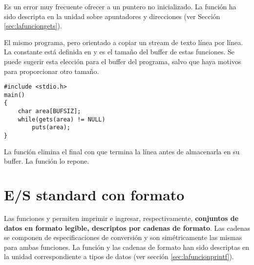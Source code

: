 Es un error muy frecuente ofrecer a  un puntero
no inicializado. La función  ha sido descripta en la unidad sobre
apuntadores y direcciones (ver Sección \ref{sec:lafunciongets}).


\begin{ejemplo}
El mismo programa, pero orientado a copiar un stream de texto línea por línea.
La constante  está definida en  y es el tamaño del buffer de estas
funciones. Se puede sugerir esta elección para el buffer del programa, salvo
que haya motivos para proporcionar otro tamaño.

\begin{lstlisting}
#include <stdio.h>
main()
{
    char area[BUFSIZ];
    while(gets(area) != NULL)
        puts(area);
}
\end{lstlisting}
\end{ejemplo}

La función  elimina el \code{\\n} final con que termina la línea antes de
almacenarla en su buffer. La función  lo repone.


\section{E/S standard con formato}
\label{subsec:esstandardformato}
Las funciones  y  permiten imprimir e ingresar, respectivamente,
\textbf{conjuntos de datos en formato legible, descriptos por cadenas de formato}. Las
cadenas se componen de especificaciones de conversión y son simétricamente las
mismas para ambas funciones. La función  y las cadenas de formato han
sido descriptas en la unidad correspondiente a tipos de datos (ver sección \ref{sec:lafuncionprintf}).

